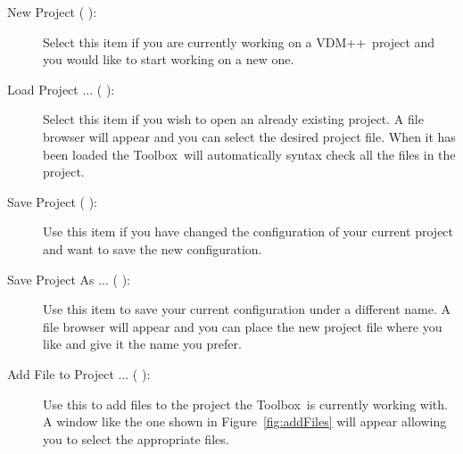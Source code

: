 \documentclass[\pformat,12pt]{article}
\newcommand{\vdmslpp}{VDM++}
\newcommand{\Toolbox}{Toolbox}
\newcommand{\guicmd}[1]{{\sf #1}}
\begin{document}
\begin{description}

\item[\guicmd{New Project} (\hspace{-1.8mm}
):]
Select this item if you are currently working on 
  a \vdmslpp\ project and you would like to start working on a new
  one.

\item[\guicmd{Load Project ...} (\hspace{-1.2mm}
\hspace{.6mm}):]
Select this item if you wish to open an already 
  existing project. A file browser will appear and you can select the
  desired project file. When it has been loaded the \Toolbox\ will
  automatically syntax check all the files in the project.

\item[\guicmd{Save Project} (\hspace{-1.8mm}
):]
  Use this item if you have changed the 
  configuration of your current project and want to save the new
  configuration.

\item[\guicmd{Save Project As ...} (\hspace{-1.5mm}
):]
  Use this item to save your current 
  configuration under a different name. A file browser will appear and
  you can place the new project file where you like and give it the
  name you prefer.

\item[\guicmd{Add File to Project ...} (\hspace{-1.5mm}
):] 
  Use this to add files to the
  project  the \Toolbox\ is currently working with. A window like the
  one shown in Figure~\ref{fig:addFiles} will appear allowing you to
  select the appropriate files. 


\end{description}
\end{document}

